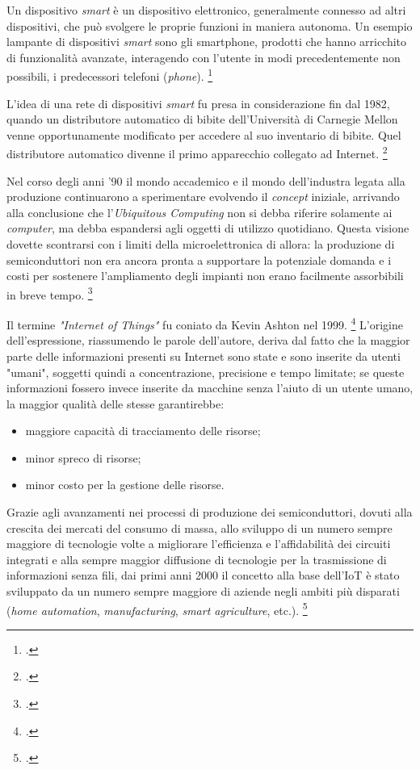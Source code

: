 Un dispositivo \emph{smart} è un dispositivo elettronico, generalmente connesso ad altri dispositivi, che può svolgere le proprie funzioni in maniera autonoma.
Un esempio lampante di dispositivi \emph{smart} sono gli smartphone, prodotti che hanno arricchito di funzionalità avanzate, interagendo con l'utente in modi precedentemente non possibili, i predecessori telefoni (\emph{phone}).
\footcite{site:smart-device}

L'idea di una rete di dispositivi \emph{smart} fu presa in considerazione fin dal 1982, quando un distributore automatico di bibite dell'Università di Carnegie Mellon venne opportunamente modificato per accedere al suo inventario di bibite. Quel distributore automatico divenne il primo apparecchio collegato ad Internet.
\footcite{site:mellon-uni}

Nel corso degli anni '90 il mondo accademico e il mondo dell'industra legata alla produzione continuarono a sperimentare evolvendo il \textit{concept} iniziale, arrivando alla conclusione che l'\textit{Ubiquitous Computing} non si debba riferire solamente ai \textit{computer}, ma debba espandersi agli oggetti di utilizzo quotidiano. Questa visione dovette scontrarsi con i limiti della microelettronica di allora: la produzione di semiconduttori non era ancora pronta a supportare la potenziale domanda e i costi per sostenere l'ampliamento degli impianti non erano facilmente assorbibili in breve tempo.
\footcite{site:mit-weiser}

Il termine \textit{"Internet of Things"} fu coniato da Kevin Ashton nel 1999.
\footcite{site:iot-kashton}
L'origine dell'espressione, riassumendo le parole dell'autore, deriva dal fatto che la maggior parte delle informazioni presenti su Internet sono state e sono inserite da utenti "umani", soggetti quindi a concentrazione, precisione e tempo limitate;
se queste informazioni fossero invece inserite da macchine senza l'aiuto di un utente umano, la maggior qualità delle stesse garantirebbe:
\begin{itemize}
  \item maggiore capacità di tracciamento delle risorse;
  \item minor spreco di risorse;
  \item minor costo per la gestione delle risorse.
\end{itemize}

Grazie agli avanzamenti nei processi di produzione dei semiconduttori, dovuti alla crescita dei mercati del consumo di massa, allo sviluppo di un numero sempre maggiore di tecnologie volte a migliorare l'efficienza e l'affidabilità dei circuiti integrati e alla sempre maggior diffusione di tecnologie per la trasmissione di informazioni senza fili, dai primi anni 2000 il concetto alla base dell'IoT è stato sviluppato da un numero sempre maggiore di aziende negli ambiti più disparati (\textit{home automation}, \textit{manufacturing}, \textit{smart agriculture}, etc.).
\footcite{site:pc-to-things}

